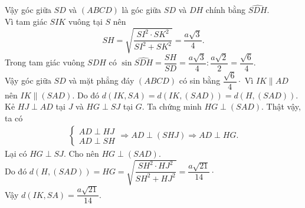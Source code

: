 \begin{ex}
{\begin{itemchoice}
  Vậy góc giữa $SD$ và $(ABCD)$ là góc giữa $SD$  và $DH$ chính bằng $\widehat{SDH}$.\\
  Vì tam giác  $SIK$ vuông tại $S$ nên
  $$SH = \sqrt{\dfrac{SI^2 \cdot SK^2}{SI^2 + SK^2}}  = \dfrac{a\sqrt{3}}{4}.$$
  Trong tam giác vuông $SDH$ có $\sin \widehat{SDH} = \dfrac{SH}{SD} = \dfrac{a\sqrt{3}}{4} :  \dfrac{a\sqrt{2}}{2} = \dfrac{\sqrt{6}}{4}$.\\
  Vậy  góc giữa $SD$ và mặt phẳng đáy $(ABCD)$ có sin bằng $\dfrac{\sqrt{6}}{4}\cdot$
  \itemch Vì $IK \parallel AD$  nên $IK \parallel (SAD)$. Do đó $d(IK,SA) = d(IK,(SAD)) = d(H,(SAD))$.\\
  Kẻ $HJ \perp AD$ tại $J$ và $HG \perp SJ$ tại $G$. Ta chứng  minh $HG \perp (SAD)$. Thật vậy, ta có
  \begin{align*}
   \begin{cases} AD \perp HJ \\ AD \perp SH
   \end{cases} \Rightarrow AD \perp (SHJ) \Rightarrow AD \perp HG.
  \end{align*}
   Lại có $HG \perp SJ$. Cho nên $HG \perp (SAD)$.\\
  Do đó $d(H,(SAD)) = HG = \sqrt{\dfrac{SH^2  \cdot HJ^2}{SH^2 + HJ^2}} = \dfrac{a\sqrt{21}}{14}\cdot$\\
  Vậy $d(IK,SA) =  \dfrac{a\sqrt{21}}{14}$.
 \end{itemchoice}
  }
\end{ex}

